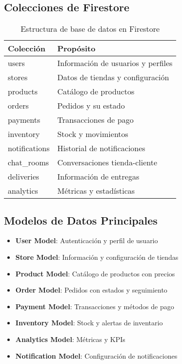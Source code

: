 \documentclass[12pt,a4paper]{article}
\begin{document}
\subsection{Colecciones de Firestore}
\begin{table}[H]
\centering
\begin{tabular}{@{}ll@{}}
\toprule
\textbf{Colección} & \textbf{Propósito} \\
\midrule
users & Información de usuarios y perfiles \\
stores & Datos de tiendas y configuración \\
products & Catálogo de productos \\
orders & Pedidos y su estado \\
payments & Transacciones de pago \\
inventory & Stock y movimientos \\
notifications & Historial de notificaciones \\
chat\_rooms & Conversaciones tienda-cliente \\
deliveries & Información de entregas \\
analytics & Métricas y estadísticas \\
\bottomrule
\end{tabular}
\caption{Estructura de base de datos en Firestore}
\end{table}

\subsection{Modelos de Datos Principales}
\begin{itemize}[itemsep=0.5em]
    \item \textbf{User Model}: Autenticación y perfil de usuario
    \item \textbf{Store Model}: Información y configuración de tiendas
    \item \textbf{Product Model}: Catálogo de productos con precios
    \item \textbf{Order Model}: Pedidos con estados y seguimiento
    \item \textbf{Payment Model}: Transacciones y métodos de pago
    \item \textbf{Inventory Model}: Stock y alertas de inventario
    \item \textbf{Analytics Model}: Métricas y KPIs
    \item \textbf{Notification Model}: Configuración de notificaciones
\end{itemize}
\end{document}
